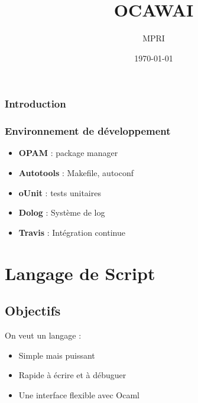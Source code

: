\documentclass[french,xcolor={usenames,dvipsnames}]{beamer}
\author{MPRI}
\date{\today}
\title{OCAWAI}
\newenvironment{bitemize}{\begin{itemize}[<+->]}{\end{itemize}}
\begin{document}
\begin{frame}
\titlepage
\end{frame}

\begin{frame}
\frametitle{Introduction}

\end{frame}

\begin{frame}
\frametitle{Environnement de développement}

\begin{bitemize}
  \item \textbf{OPAM} : package manager
  \item \textbf{Autotools} : Makefile, autoconf
  \item \textbf{oUnit} : tests unitaires
  \item \textbf{Dolog} : Système de log
  \item \textbf{Travis} : Intégration continue
\end{bitemize}
\end{frame}

\section{Langage de Script}

\subsection{Objectifs}

\begin{frame}
  On veut un langage : 
  \vspace{10pt}
  \begin{itemize}
    \item Simple mais puissant

    \vspace{10pt}

    \item Rapide à écrire et à débuguer

    \vspace{10pt}

    \item Une interface flexible avec Ocaml
  \end{itemize}
\end{frame}
\end{document}
